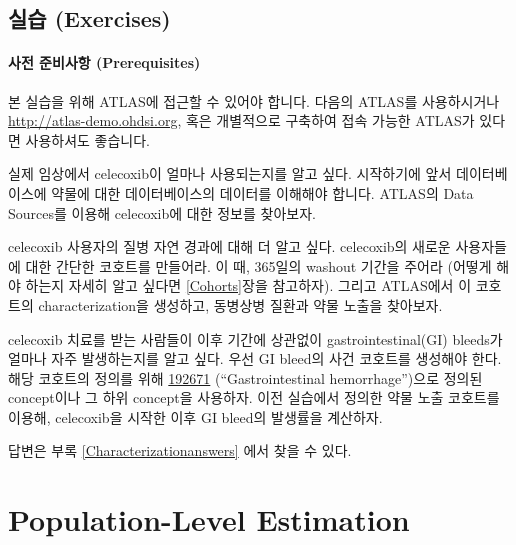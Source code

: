 \documentclass[11pt]{book}
\theoremstyle{definition}
\theoremstyle{definition}
\theoremstyle{definition}
\theoremstyle{remark}
\let\BeginKnitrBlock\begin \let\EndKnitrBlock\end
\begin{document}
\section{실습 (Exercises)}\label{-exercises}

\subsubsection*{사전 준비사항 (Prerequisites)}\label{--prerequisites}

본 실습을 위해 ATLAS에 접근할 수 있어야 합니다. 다음의 ATLAS를
사용하시거나 \url{http://atlas-demo.ohdsi.org}, 혹은 개별적으로 구축하여
접속 가능한 ATLAS가 있다면 사용하셔도 좋습니다.

\BeginKnitrBlock{exercise}
\protect\hypertarget{exr:exerciseCharacterization1}{}{\label{exr:exerciseCharacterization1}
}실제 임상에서 celecoxib이 얼마나 사용되는지를 알고 싶다. 시작하기에
앞서 데이터베이스에 약물에 대한 데이터베이스의 데이터를 이해해야 합니다.
ATLAS의 Data Sources를 이용해 celecoxib에 대한 정보를 찾아보자.
\EndKnitrBlock{exercise}

\BeginKnitrBlock{exercise}
\protect\hypertarget{exr:exerciseCharacterization2}{}{\label{exr:exerciseCharacterization2}
}celecoxib 사용자의 질병 자연 경과에 대해 더 알고 싶다. celecoxib의
새로운 사용자들에 대한 간단한 코호트를 만들어라. 이 때, 365일의 washout
기간을 주어라 (어떻게 해야 하는지 자세히 알고 싶다면 \ref{Cohorts}장을
참고하자). 그리고 ATLAS에서 이 코호트의 characterization을 생성하고,
동병상병 질환과 약물 노출을 찾아보자.
\EndKnitrBlock{exercise}

\BeginKnitrBlock{exercise}
\protect\hypertarget{exr:exerciseCharacterization3}{}{\label{exr:exerciseCharacterization3}
}celecoxib 치료를 받는 사람들이 이후 기간에 상관없이
gastrointestinal(GI) bleeds가 얼마나 자주 발생하는지를 알고 싶다. 우선
GI bleed의 사건 코호트를 생성해야 한다. 해당 코호트의 정의를 위해
\href{http://athena.ohdsi.org/search-terms/terms/192671}{192671}
(``Gastrointestinal hemorrhage'')으로 정의된 concept이나 그 하위
concept을 사용하자. 이전 실습에서 정의한 약물 노출 코호트를 이용해,
celecoxib을 시작한 이후 GI bleed의 발생률을 계산하자.
\EndKnitrBlock{exercise}

답변은 부록 \ref{Characterizationanswers} 에서 찾을 수 있다.

\chapter{Population-Level Estimation}\label{PopulationLevelEstimation}
\end{document}
